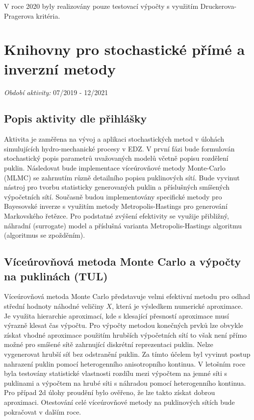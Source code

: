 \documentclass[11pt,a4paper]{article}
\begin{document}
\begin{onehalfspacing}
V roce 2020 byly realizovány pouze testovací výpočty s využitím Druckerova-Pragerova kritéria. 

\section{Knihovny pro stochastické přímé a inverzní metody}
\label{sec:stochastic}
{\it Období aktivity:}  07/2019 - 12/2021

\subsection{Popis aktivity dle přihlášky}
Aktivita je zaměřena na vývoj a aplikaci stochastických metod v úlohách simulujících hydro-mechanické procesy v EDZ. V první fázi
bude formulován stochastický popis parametrů uvažovaných modelů včetně popisu rozdělení puklin. Následovat bude implementace
víceúrovňové metody Monte-Carlo (MLMC) se zahrnutím různě detailního popisu puklinových sítí. Bude vyvinut nástroj pro tvorbu
statisticky generovaných puklin a příslušných smíšených výpočetních sítí. Současně budou implementovány specifické metody pro
Bayesovské inverze s využitím metody Metropolis-Hastings pro generování Markovského řetězce. Pro podstatné zvýšení efektivity se
využije přibližný, náhradní (surrogate) model a příslušná varianta Metropolis-Hastings algoritmu (algoritmus se zpožděním).


\subsection{Víceúrovňová metoda Monte Carlo a výpočty na puklinách (TUL)}

Víceúrovňová metoda Monte Carlo představuje velmi efektivní metodu pro odhad střední hodnoty náhodné veličiny $X$, která je výsledkem 
numerické aproximace. Je využita hierarchie aproximací, kde s klesající přesností aproximace musí výrazně klesat čas výpočtu. 
Pro výpočty metodou konečných prvků lze obvykle získat vhodné aproximace použitím hrubších výpočetních sítí to však není přímo možné
pro smíšené sítě zahrnující diskrétní reprezentaci puklin. Nelze vygenerovat hrubší síť bez odstranění puklin. Za tímto 
účelem byl vyvinut postup nahrazení puklin pomocí heterogenního anisotropního kontinua. V letošním roce byla testovány statistické vlastnosti
rozdílu mezi výpočtem na jemné síti s puklinami a výpočtem na hrubé síti s náhradou pomocí heterogenního kontinua. Pro případ 2d úlohy proudění 
bylo ověřeno, že lze takto získat dobrou aproximaci. Otestování celé víceúrovňové metody na puklinových sítích bude pokračovat v dalším roce.


\end{onehalfspacing}
\end{document}

